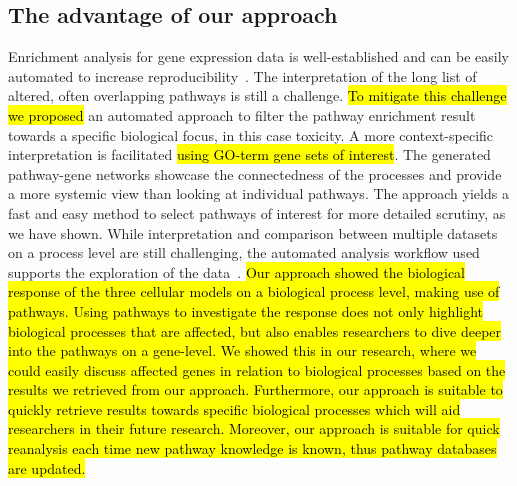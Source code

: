 \documentclass[ijms,article,submit,moreauthors,pdftex]{Definitions/mdpi}
\begin{document}
\subsection*{The advantage of our approach}
Enrichment analysis for gene expression data is well-established and can be easily automated to increase reproducibility~\cite{Yu2012}. The interpretation of the long list of altered, often overlapping pathways is still a challenge. \hl{To mitigate this challenge we proposed} an automated approach to filter the pathway enrichment result towards a specific biological focus, in this case toxicity. A more context-specific interpretation is facilitated \hl{using GO-term gene sets of interest}. The generated pathway-gene networks showcase the connectedness of the processes and provide a more systemic view than looking at individual pathways. The approach yields a fast and easy method to select pathways of interest for more detailed scrutiny, as we have shown. While interpretation and comparison between multiple datasets on a process level are still challenging, the automated analysis workflow used supports the exploration of the data~\cite{TiO2-scripts}. \hl{Our approach showed the biological response of the three cellular models on a biological process level, making use of pathways. Using pathways to investigate the response does not only highlight biological processes that are affected, but also enables researchers to dive deeper into the pathways on a gene-level. We showed this in our research, where we could easily discuss affected genes in relation to biological processes based on the results we retrieved from our approach. Furthermore, our approach is suitable to quickly retrieve results towards specific biological processes which will aid researchers in their future research. Moreover, our approach is suitable for quick reanalysis each time new pathway knowledge is known, thus pathway databases are updated.}

\end{document}
